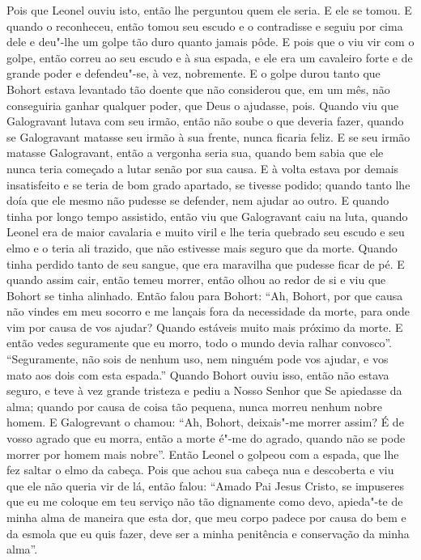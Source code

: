 Pois que Leonel ouviu isto, então lhe perguntou quem ele seria. E ele se tomou.
E quando o reconheceu, então tomou seu escudo e o contradisse e seguiu por cima
dele e deu"-lhe um golpe tão duro quanto jamais pôde. E pois que o viu vir com o
golpe, então correu ao seu escudo e à sua espada, e ele era um cavaleiro forte
e de grande poder e defendeu"-se, à vez, nobremente. E o golpe durou tanto que
Bohort estava levantado tão doente que não considerou que, em um mês, não
conseguiria ganhar qualquer poder, que Deus o ajudasse, pois. Quando viu que
Galogravant lutava com seu irmão, então não soube o que deveria fazer, quando
se Galogravant matasse seu irmão à sua frente, nunca ficaria feliz. E se seu
irmão matasse Galogravant, então a vergonha seria sua, quando bem sabia que ele
nunca teria começado a lutar senão por sua causa. E à volta estava por demais
insatisfeito e se teria de bom grado apartado, se tivesse podido; quando tanto
lhe doía que ele mesmo não pudesse se defender, nem ajudar ao outro. E quando
tinha por longo tempo assistido, então viu que Galogravant caiu na luta, quando
Leonel era de maior cavalaria e muito viril e lhe teria quebrado seu escudo e
seu elmo e o teria ali trazido, que não estivesse mais seguro que da morte.
Quando tinha perdido tanto de seu sangue, que era maravilha que pudesse ficar
de pé. E quando assim cair, então temeu morrer, então olhou ao redor de si e
viu que Bohort se tinha alinhado. Então falou para Bohort: “Ah, Bohort, por que
causa não vindes em meu socorro e me lançais fora da necessidade da morte, para
onde vim por causa de vos ajudar? Quando estáveis muito mais próximo da morte.
E então vedes seguramente que eu morro, todo o mundo devia ralhar convosco”.
“Seguramente, não sois de nenhum uso, nem ninguém pode vos ajudar, e vos mato
aos dois com esta espada.” Quando Bohort ouviu isso, então não estava seguro, e
teve à vez grande tristeza e pediu a Nosso Senhor que Se apiedasse da alma;
quando por causa de coisa tão pequena, nunca morreu nenhum nobre homem. E
Galogrevant o chamou: “Ah, Bohort, deixais"-me morrer assim? É de vosso agrado
que eu morra, então a morte é"-me do agrado, quando não se pode morrer por homem
mais nobre”. Então Leonel o golpeou com a espada, que lhe fez saltar o
elmo da cabeça. Pois que achou sua cabeça nua e descoberta e viu que ele não
queria vir de lá, então falou: “Amado Pai Jesus Cristo, se impuseres que eu me
coloque em teu serviço não tão dignamente como devo, apieda"-te de minha alma de
maneira que esta dor, que meu corpo padece por causa do bem e da esmola que eu
quis fazer, deve ser a minha penitência e conservação da minha alma”.

